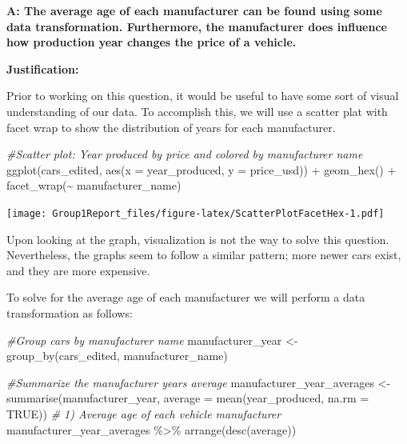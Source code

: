 \documentclass[
]{article}
\newenvironment{Shaded}{\begin{snugshade}}{\end{snugshade}}
\newcommand{\AttributeTok}[1]{\textcolor[rgb]{0.77,0.63,0.00}{#1}}
\newcommand{\CommentTok}[1]{\textcolor[rgb]{0.56,0.35,0.01}{\textit{#1}}}
\newcommand{\ConstantTok}[1]{\textcolor[rgb]{0.00,0.00,0.00}{#1}}
\newcommand{\FunctionTok}[1]{\textcolor[rgb]{0.00,0.00,0.00}{#1}}
\newcommand{\NormalTok}[1]{#1}
\newcommand{\OtherTok}[1]{\textcolor[rgb]{0.56,0.35,0.01}{#1}}
\newcommand{\SpecialCharTok}[1]{\textcolor[rgb]{0.00,0.00,0.00}{#1}}
\begin{document}
\textbf{A: The average age of each manufacturer can be found using some
data transformation. Furthermore, the manufacturer does influence how
production year changes the price of a vehicle.}

\textbf{Justification:}

Prior to working on this question, it would be useful to have some sort
of visual understanding of our data. To accomplish this, we will use a
scatter plat with facet wrap to show the distribution of years for each
manufacturer.

\begin{Shaded}
\begin{Highlighting}[]
\CommentTok{\#Scatter plot: Year produced by price and colored by manufacturer name}
\FunctionTok{ggplot}\NormalTok{(cars\_edited, }\FunctionTok{aes}\NormalTok{(}\AttributeTok{x =}\NormalTok{ year\_produced, }\AttributeTok{y =}\NormalTok{ price\_usd)) }\SpecialCharTok{+} \FunctionTok{geom\_hex}\NormalTok{() }\SpecialCharTok{+} \FunctionTok{facet\_wrap}\NormalTok{(}\SpecialCharTok{\textasciitilde{}}\NormalTok{ manufacturer\_name)}
\end{Highlighting}
\end{Shaded}

\texttt{[image: Group1Report\_files/figure-latex/ScatterPlotFacetHex-1.pdf]}

Upon looking at the graph, visualization is not the way to solve this
question. Nevertheless, the graphs seem to follow a similar pattern;
more newer cars exist, and they are more expensive.

To solve for the average age of each manufacturer we will perform a data
transformation as follows:

\begin{Shaded}
\begin{Highlighting}[]
\CommentTok{\#Group cars by manufacturer name}
\NormalTok{manufacturer\_year }\OtherTok{\textless{}{-}} \FunctionTok{group\_by}\NormalTok{(cars\_edited, manufacturer\_name)}

\CommentTok{\#Summarize the manufacturer years average}
\NormalTok{manufacturer\_year\_averages }\OtherTok{\textless{}{-}} \FunctionTok{summarise}\NormalTok{(manufacturer\_year, }\AttributeTok{average =} \FunctionTok{mean}\NormalTok{(year\_produced, }\AttributeTok{na.rm =} \ConstantTok{TRUE}\NormalTok{))}
\CommentTok{\# 1) Average age of each vehicle manufacturer}
\NormalTok{manufacturer\_year\_averages }\SpecialCharTok{\%\textgreater{}\%} \FunctionTok{arrange}\NormalTok{(}\FunctionTok{desc}\NormalTok{(average))}
\end{Highlighting}
\end{Shaded}
\end{document}
